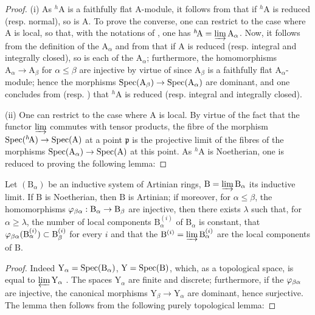 \begin{proof}
(i) As ${}^h\!\mathrm{A}$ is a faithfully flat A-module, it follows from  that if ${}^h\!\mathrm{A}$ is reduced (resp. normal), so is A.
To prove the converse, one can restrict to the case where A is local, so that, with the notations of , one has ${}^h\!\mathrm{A}=\varinjlim\mathrm{A}_\alpha$.
Now, it follows from the definition of the $\mathrm{A}_\alpha$ and from  that if A is reduced (resp. integral and integrally closed), so is each of the $\mathrm{A}_\alpha$;
furthermore, the homomorphisms $\mathrm{A}_\alpha\to\mathrm{A}_\beta$ for $\alpha\leq\beta$ are injective by virtue of  since $\mathrm{A}_\beta$ is a faithfully flat $\mathrm{A}_\alpha$-module;
hence the morphisms $\operatorname{Spec}(\mathrm{A}_\beta)\to\operatorname{Spec}(\mathrm{A}_\alpha)$ are dominant, and one concludes from  (resp. ) that ${}^h\!\mathrm{A}$ is reduced (resp. integral and integrally closed).

(ii) One can restrict to the case where A is local.
By virtue of the fact that the functor $\varinjlim$ commutes with tensor products, the fibre of the morphism $\operatorname{Spec}({}^h\!\mathrm{A})\to\operatorname{Spec}(\mathrm{A})$ at a point $\mathfrak{p}$ is the projective limit of the fibres of the morphisms $\operatorname{Spec}(\mathrm{A}_\alpha)\to\operatorname{Spec}(\mathrm{A})$ at this point.
As ${}^h\!\mathrm{A}$ is Noetherian, one is reduced to proving the following lemma:
\end{proof}

\begin{lemma}[18.6.9.1]
\label{IV.18.6.9.1}
Let $(\mathrm{B}_\alpha)$ be an inductive system of Artinian rings, $\mathrm{B}=\varinjlim\mathrm{B}_\alpha$ its inductive limit.
If $\mathrm{B}$ is Noetherian, then $\mathrm{B}$ is Artinian;
if moreover, for $\alpha\leq\beta$, the homomorphisms $\varphi_{\beta\alpha}:\mathrm{B}_\alpha\to\mathrm{B}_\beta$ are injective, then there exists $\lambda$ such that, for $\alpha\geq\lambda$, the number of local components $\mathrm{B}_\alpha^{(i)}$ of $\mathrm{B}_\alpha$ is constant, that $\varphi_{\beta\alpha}(\mathrm{B}_\alpha^{(i)})\subset\mathrm{B}_\beta^{(i)}$ for every $i$ and that the $\mathrm{B}^{(i)}=\varinjlim\mathrm{B}_\alpha^{(i)}$ are the local components of $\mathrm{B}$.
\end{lemma}

\begin{proof}
Indeed $\mathrm{Y}_\alpha=\operatorname{Spec}(\mathrm{B}_\alpha)$, $\mathrm{Y}=\operatorname{Spec}(\mathrm{B})$, which, as a topological space, is equal to $\varprojlim\mathrm{Y}_\alpha$ .
The spaces $\mathrm{Y}_\alpha$ are finite and discrete;
furthermore, if the $\varphi_{\beta\alpha}$ are injective, the canonical morphisms $\mathrm{Y}_\beta\to\mathrm{Y}_\alpha$ are dominant, hence surjective.
The lemma then follows from the following purely topological lemma:
\end{proof}

